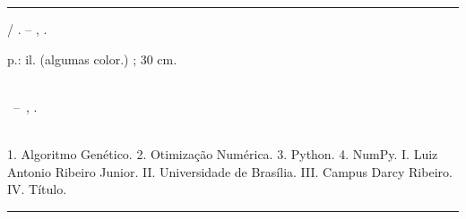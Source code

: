 \begin{fichacatalografica}
    \vspace*{\fill}										%
    \hrule														%
    \begin{center}										%
        \begin{minipage}[c]{12.5cm}			%
            
            \imprimirautor
            
            \hspace{0.5cm} \imprimirtitulo  / \imprimirautor. --
            \imprimirlocal, \imprimirdata.
            
            \hspace{0.5cm} \pageref{LastPage} p.: il. (algumas color.) ; 30 cm.\\
            
            \hspace{0.5cm} \imprimirorientadorRotulo~\imprimirorientador\\
            
            \hspace{0.5cm}
            \parbox[t]{\textwidth}{\imprimirtipotrabalho~--~\imprimirinstituicao,
                \imprimirdata.}\\
            
            \hspace{0.5cm}
            1. Algoritmo Genético.
            2. Otimização Numérica.
            3. Python.
            4. NumPy.
            I. Luiz Antonio Ribeiro Junior.
            II. Universidade de Brasília.
            III. Campus Darcy Ribeiro.
            IV. Título.\\ 			
            
            
        \end{minipage}
    \end{center}
    \hrule
\end{fichacatalografica}